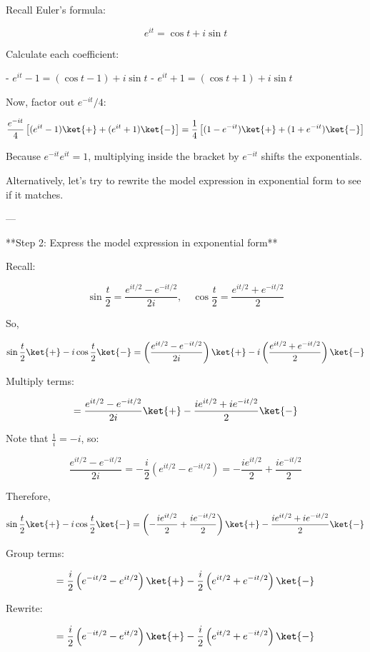\documentclass[10pt]{article}
\begin{document}
Recall Euler's formula:

\[
e^{it} = \cos t + i \sin t
\]

Calculate each coefficient:

- \(e^{it} - 1 = (\cos t - 1) + i \sin t\)
- \(e^{it} + 1 = (\cos t + 1) + i \sin t\)

Now, factor out \(e^{-it}/4\):

\[
\frac{e^{-it}}{4} \left[ (e^{it} - 1) \ket{+} + (e^{it} + 1) \ket{-} \right]
= \frac{1}{4} \left[ (1 - e^{-it}) \ket{+} + (1 + e^{-it}) \ket{-} \right]
\]

Because \(e^{-it} e^{it} = 1\), multiplying inside the bracket by \(e^{-it}\) shifts the exponentials.

Alternatively, let's try to rewrite the model expression in exponential form to see if it matches.

---

**Step 2: Express the model expression in exponential form**

Recall:

\[
\sin \frac{t}{2} = \frac{e^{i t/2} - e^{-i t/2}}{2i}, \quad \cos \frac{t}{2} = \frac{e^{i t/2} + e^{-i t/2}}{2}
\]

So,

\[
\sin \frac{t}{2} \ket{+} - i \cos \frac{t}{2} \ket{-} = \left(\frac{e^{i t/2} - e^{-i t/2}}{2i}\right) \ket{+} - i \left(\frac{e^{i t/2} + e^{-i t/2}}{2}\right) \ket{-}
\]

Multiply terms:

\[
= \frac{e^{i t/2} - e^{-i t/2}}{2i} \ket{+} - \frac{i e^{i t/2} + i e^{-i t/2}}{2} \ket{-}
\]

Note that \(\frac{1}{i} = -i\), so:

\[
\frac{e^{i t/2} - e^{-i t/2}}{2i} = -\frac{i}{2} (e^{i t/2} - e^{-i t/2}) = -\frac{i e^{i t/2}}{2} + \frac{i e^{-i t/2}}{2}
\]

Therefore,

\[
\sin \frac{t}{2} \ket{+} - i \cos \frac{t}{2} \ket{-} = \left(-\frac{i e^{i t/2}}{2} + \frac{i e^{-i t/2}}{2}\right) \ket{+} - \frac{i e^{i t/2} + i e^{-i t/2}}{2} \ket{-}
\]

Group terms:

\[
= \frac{i}{2} \left( e^{-i t/2} - e^{i t/2} \right) \ket{+} - \frac{i}{2} \left( e^{i t/2} + e^{-i t/2} \right) \ket{-}
\]

Rewrite:

\[
= \frac{i}{2} \left( e^{-i t/2} - e^{i t/2} \right) \ket{+} - \frac{i}{2} \left( e^{i t/2} + e^{-i t/2} \right) \ket{-}
\]
\end{document}
